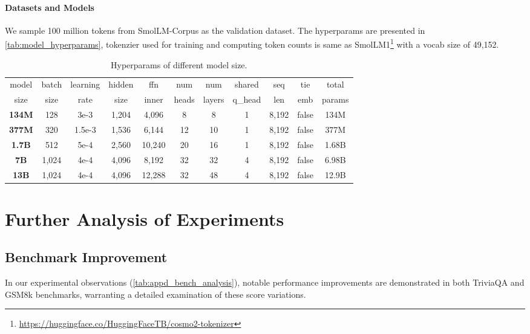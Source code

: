 \paragraph{Datasets and Models}
We sample 100 million tokens from SmolLM-Corpus as the validation dataset. 
The hyperparams are presented in \autoref{tab:model_hyperparams}, tokenzier used for training and computing token counts is same as 
SmolLM1\footnote{\url{https://huggingface.co/HuggingFaceTB/cosmo2-tokenizer}} with a vocab size of 49,152. 

\begin{table*}[h]
    \centering
    \setlength{\tabcolsep}{4pt}
    \caption{Hyperparams of different model size.}
    \begin{tabular}{*{11}{c}}
        \toprule
        model & batch & learning & hidden & ffn & num & num & shared & seq & tie & total \\
        size & size & rate & size & inner & heads & layers & q\_head & len & emb & params \\
        \midrule
        \textbf{134M} & 128  & 3e-3   & 1,204 &  4,096 &  8 &  8 & 1 & 8,192 & false & 134M \\
        \textbf{377M} & 320  & 1.5e-3 & 1,536 &  6,144 & 12 & 10 & 1 & 8,192 & false & 377M \\
        \textbf{1.7B} & 512  & 5e-4   & 2,560 & 10,240 & 20 & 16 & 1 & 8,192 & false & 1.68B \\
        \textbf{7B}  & 1,024 & 4e-4   & 4,096 &  8,192 & 32 & 32 & 4 & 8,192 & false & 6.98B \\
        \textbf{13B} & 1,024 & 4e-4   & 4,096 & 12,288 & 32 & 48 & 4 & 8,192 & false & 12.9B \\
        \bottomrule
    
    \end{tabular}
   
    \label{tab:model_hyperparams}
\end{table*}

\section{Further Analysis of Experiments}
\label{sec:appd_experiments}
\subsection{Benchmark Improvement}
In our experimental observations (\autoref{tab:appd_bench_analysis}), notable performance improvements are demonstrated in both TriviaQA and GSM8k benchmarks,
 warranting a detailed examination of these score variations. 

